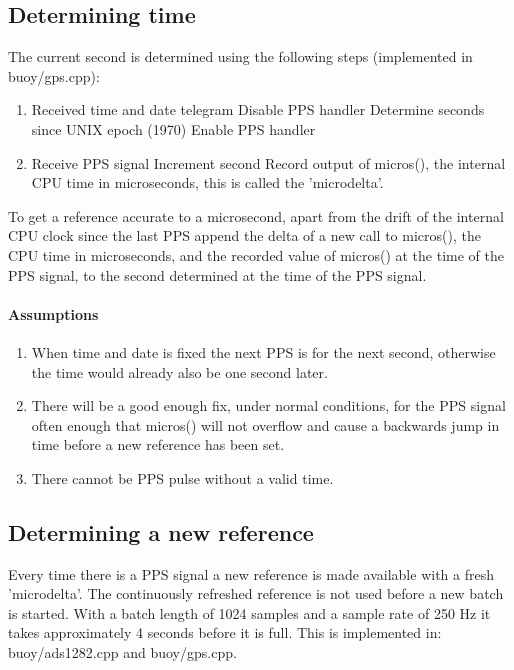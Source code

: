 \documentclass[a4paper]{article}
\begin{document}
\begin{multicols}{2}
  \subsection{Determining time}
  The current second is determined using the following steps
  (implemented in buoy/gps.cpp):

  \begin{enumerate}
    \item Received time and date telegram
      \subitem Disable PPS handler
      \subitem Determine seconds since UNIX epoch (1970)
      \subitem Enable PPS handler
    \item Receive PPS signal
      \subitem Increment second
      \subitem Record output of micros(), the internal CPU time in
      microseconds, this is called the 'microdelta'.
  \end{enumerate}

  To get a reference accurate to a microsecond, apart from the drift
  of the internal CPU clock since the last PPS append the delta of a new
  call to micros(), the CPU time in microseconds, and the recorded value
  of micros() at the time of the PPS signal, to the second determined at
  the time of the PPS signal.

  \paragraph{Assumptions}
  \begin{enumerate}
    \item When time and date is fixed the next PPS is for the next
      second, otherwise the time would already also be one second
      later.
    \item There will be a good enough fix, under normal conditions, for
      the PPS signal often enough that micros() will not overflow and
      cause a backwards jump in time before a new reference has been set.
    \item There cannot be PPS pulse without a valid time.
  \end{enumerate}

  \subsection{Determining a new reference}
  Every time there is a PPS signal a
  new reference is made available with a fresh 'microdelta'. The
  continuously refreshed reference is not used before a new batch is
  started. With a batch length of 1024 samples and a sample rate of 250
  Hz it takes approximately 4 seconds before it is full. This is
  implemented in: buoy/ads1282.cpp and buoy/gps.cpp.


\end{multicols}
\end{document}
